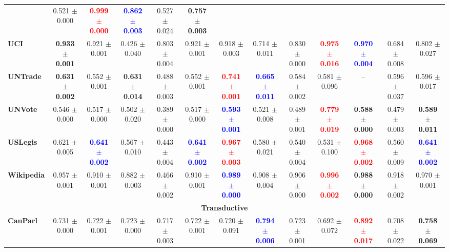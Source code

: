{\begin{tabular}{lccccc|ccccccc}
& 0.521 $\pm$ 0.000 
& \textcolor{red}{\textbf{0.999 $\pm$ 0.000 }}
& \textcolor{blue}{\textbf{0.862 $\pm$ 0.003 }}
& 0.527 $\pm$ 0.024 
& \textbf{0.757 $\pm$ 0.003 } \\
\textbf{UCI} 
& \textbf{0.933 $\pm$ 0.001 }
& 0.921 $\pm$ 0.001 
& 0.426 $\pm$ 0.040 
& 0.803 $\pm$ 0.004 
& 0.921 $\pm$ 0.001 
& 0.918 $\pm$ 0.003 
& 0.714 $\pm$ 0.011 
& 0.830 $\pm$ 0.000 
& \textcolor{red}{\textbf{0.975 $\pm$ 0.016 }}
& \textcolor{blue}{\textbf{0.970 $\pm$ 0.004 }}
& 0.684 $\pm$ 0.008 
& 0.802 $\pm$ 0.027 \\
\textbf{UNTrade} 
& \textbf{0.631 $\pm$ 0.002 }
& 0.552 $\pm$ 0.001 
& \textbf{0.631 $\pm$ 0.014 }
& 0.488 $\pm$ 0.003 
& 0.552 $\pm$ 0.001 
& \textcolor{red}{\textbf{0.741 $\pm$ 0.001 }}
& \textcolor{blue}{\textbf{0.665 $\pm$ 0.011 }}
& 0.584 $\pm$ 0.002 
& 0.581 $\pm$ 0.096 
& -- 
& 0.596 $\pm$ 0.037 
& 0.596 $\pm$ 0.017  \\
\textbf{UNVote} 
& 0.546 $\pm$ 0.000 
& 0.517 $\pm$ 0.000 
& 0.502 $\pm$ 0.020 
& 0.389 $\pm$ 0.000 
& 0.517 $\pm$ 0.000 
& \textcolor{blue}{\textbf{0.593 $\pm$ 0.001 }}
& 0.521 $\pm$ 0.008 
& 0.489 $\pm$ 0.001 
& \textcolor{red}{\textbf{0.779 $\pm$ 0.019 }}
& \textbf{0.588 $\pm$ 0.000 }
& 0.479 $\pm$ 0.003 
& \textbf{0.589 $\pm$ 0.011 }  \\
\textbf{USLegis} 
& 0.621 $\pm$ 0.005 
& \textcolor{blue}{\textbf{0.641 $\pm$ 0.002 }}
& 0.567 $\pm$ 0.010 
& 0.443 $\pm$ 0.004 
& \textcolor{blue}{\textbf{0.641 $\pm$ 0.002 }}
& \textcolor{red}{\textbf{0.967 $\pm$ 0.003 }}
& 0.580 $\pm$ 0.021 
& 0.540 $\pm$ 0.004 
& 0.531 $\pm$ 0.100 
& \textcolor{red}{\textbf{0.968 $\pm$ 0.002 }}
& 0.560 $\pm$ 0.009 
& \textcolor{blue}{\textbf{0.641 $\pm$ 0.002 }} \\
\textbf{Wikipedia} 
& 0.957 $\pm$ 0.001 
& 0.910 $\pm$ 0.001 
& 0.882 $\pm$ 0.003 
& 0.466 $\pm$ 0.002 
& 0.910 $\pm$ 0.001 
& \textcolor{blue}{\textbf{0.989 $\pm$ 0.000 }}
& 0.908 $\pm$ 0.004 
& 0.906 $\pm$ 0.000 
& \textcolor{red}{\textbf{0.996 $\pm$ 0.002 }}
& \textbf{0.988 $\pm$ 0.000 }
& 0.918 $\pm$ 0.002 
& 0.970 $\pm$ 0.001  \\
\midrule
\multicolumn{13}{c}{\textbf{Transductive}}\\
\midrule
\textbf{CanParl} 
& 0.731 $\pm$ 0.000 
& 0.722 $\pm$ 0.001 
& 0.723 $\pm$ 0.000 
& 0.717 $\pm$ 0.003 
& 0.722 $\pm$ 0.001 
& 0.720 $\pm$ 0.091 
& \textcolor{blue}{\textbf{0.794 $\pm$ 0.006 }}
& 0.723 $\pm$ 0.001 
& 0.692 $\pm$ 0.072 
& \textcolor{red}{\textbf{0.892 $\pm$ 0.017 }}
& 0.708 $\pm$ 0.022 
& \textbf{0.758 $\pm$ 0.069 } \\

\end{tabular}}
